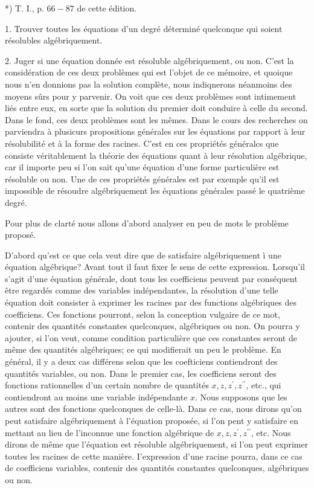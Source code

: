 \documentclass{article}
\begin{document}
*) T. I., p. \(66-87\) de cette édition.

1. Trouver toutes les équations d'un degré déterminé quelconque qui soient résolubles algébriquement.

2. Juger si une équation donnée est résoluble algébriquement, ou non. C'est la considération de ces deux problèmes qui est l'objet de ce mémoire, et quoique nous n'en donnions pas la solution complète, nous indiqnerons néanmoins des moyens sûrs pour y parvenir. On voit que ces deux problèmes sont intimement liés entre eux, en sorte que la solution du premier doit conduire à celle du second. Dans le fond, ces deux problèmes sont les mêmes. Dans le cours des recherches on parviendra à plusicurs propositions générales sur les équations par rapport à leur résolubilité et à la forme des racines. C'est en ces propriétés généralcs que consiste véritablement la théorie des équations quant à leur résolution algébrique, car il importe peu si l'on sait qu'une équation d'une forme particulière est résoluble ou non. Une de ces propriétés générales est par exemple qu'il est impossible de résoudre algébriquement les équations générales passé le quatrième degré.

Pour plus de clarté nous allons d'abord analyser en peu de mots le problème proposé.

D'abord qu'est ce que cela veut dire que de satisfaire algébriquement ì une équation algébrique? Avant tout il faut fixer le sens de cette expression. Lorsqu'il s'agit d'une équation générale, dont tous les coefficiens peuvent par conséquent être regardés comme des variables indépendantes, la résolution d'une telle équation doit consister à exprimer les racines par des functions algébriques des coefficiens. Ces fonctions pourront, selon la conception vulgaire de ce mot, contenir des quantités constantes quelconques, algébriques ou non. On pourra y ajouter, si l'on veut, comme condition particulière que ces constantes seront de même des quantités algébriques; ce qui modifierait un peu le problème. En général, il y a deux cas différens selon que les coefticiens contiendront des quantités variables, ou non. Dans le premier cas, les coefficiens seront des fonctions rationnelles d'un certain nombre de quantités \(x, z, z^{\prime}, z^{\prime \prime}\), etc., qui contiendront au moins une variable indépendante \(x\). Nous supposons que les autres sont des fonctions quelconques de celle-là. Dans ce cas, nous dirons qu'on peut satisfaire algébriquement à l'équation proposée, si l'on pent y satisfaire en mettant au lieu de l'inconnue une fonction algébrique de \(x, z, z^{\prime}, z^{\prime \prime}\), etc. Nous dirons de même que l'équation est résoluble algébriquement, si l'on peut exprimer toutes les racines de cette manière. I'expression d'une racine pourra, dans ce
cas de coefficiens variables, contenir des quantités constantes quelconques, algébriques ou non.
\end{document}
